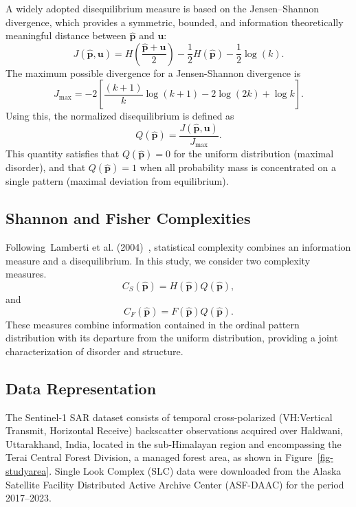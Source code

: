 A widely adopted disequilibrium measure is based on the Jensen--Shannon divergence, which provides a symmetric, bounded, and information theoretically meaningful distance between \(\widehat{\mathbf{p}}\) and
\(\mathbf{u}\): \[
J(\widehat{\mathbf{p}},\mathbf{u})
= H\!\left(\frac{\widehat{\mathbf{p}}+\mathbf{u}}{2}\right)
- \frac{1}{2}H(\widehat{\mathbf{p}})
- \frac{1}{2}\log(k).
\] 
The maximum possible divergence for a Jensen-Shannon divergence is 
\[
J_{\max}
= -2\left[\frac{(k+1)}{k}\log(k+1) - 2\log(2k) + \log k\right].
\] 
Using this, the normalized disequilibrium is defined as 
\[
Q(\widehat{\mathbf{p}}) = \frac{J(\widehat{\mathbf{p}},\mathbf{u})}{J_{\max}}.
\] 
This quantity satisfies that \(Q(\widehat{\mathbf{p}}) = 0\) for the uniform distribution (maximal disorder), and that \(Q(\widehat{\mathbf{p}}) = 1\) when all probability mass is concentrated on a single pattern (maximal deviation from equilibrium).

\subsection{Shannon and Fisher Complexities}\label{shannon-and-fisher-complexities}

Following~Lamberti et al. (2004)~\cite{lamberti2004intensive}, statistical complexity combines an information measure and a disequilibrium. In this study, we consider two complexity measures. 
\[
C_S(\widehat{\mathbf p}) = H(\widehat{\mathbf p})Q(\widehat{\mathbf p}),
\] and \[
C_F(\widehat{\mathbf p}) = F(\widehat{\mathbf p})Q(\widehat{\mathbf p}).
\] 
These measures combine information contained in the ordinal pattern distribution with its departure from the uniform distribution, providing a joint characterization of disorder and structure.

\subsection{Data Representation}\label{data-representation}

The Sentinel-1 SAR dataset consists of temporal cross-polarized (VH:Vertical Transmit, Horizontal Receive) backscatter observations acquired over Haldwani, Uttarakhand, India, located in the sub-Himalayan region and encompassing the Terai Central Forest Division, a managed forest area, as shown in Figure~\ref{fig-studyarea}. Single Look Complex (SLC) data were downloaded from the Alaska Satellite Facility Distributed Active Archive Center (ASF-DAAC) for the period 2017--2023.

